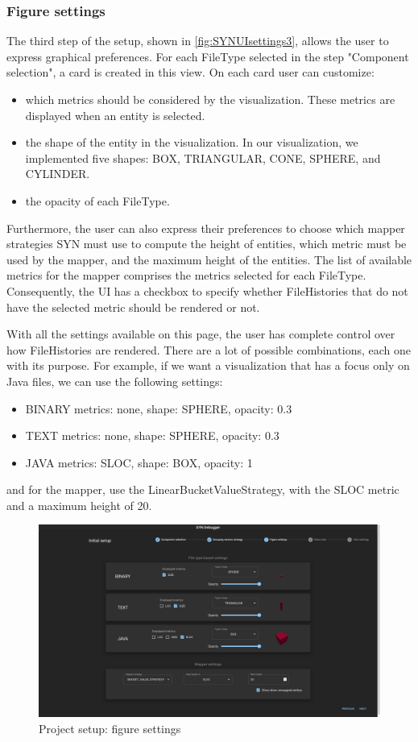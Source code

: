 \subsubsection*{Figure settings}
The third step of the setup, shown in \autoref{fig:SYNUIsettings3}, allows the user to express graphical preferences. 
For each FileType selected in the step "Component selection", a card is created in this view. 
On each card user can customize:
\begin{itemize}
    \item which metrics should be considered by the visualization. These metrics are displayed when an entity is selected.
    \item the shape of the entity in the visualization. In our visualization, we implemented five shapes: BOX, TRIANGULAR, CONE, SPHERE, and CYLINDER. 
    \item the opacity of each FileType. 
\end{itemize}

Furthermore, the user can also express their preferences to choose which mapper strategies SYN must use to compute the height of entities, which metric must be used by the mapper, and the maximum height of the entities. 
The list of available metrics for the mapper comprises the metrics selected for each FileType.
Consequently, the UI has a checkbox to specify whether FileHistories that do not have the selected metric should be rendered or not. 

With all the settings available on this page, the user has complete control over how FileHistories are rendered. 
There are a lot of possible combinations, each one with its purpose. For example, if we want a visualization that has a focus only on Java files, we can use the following settings:
\begin{itemize}
    \item BINARY metrics: none, shape: SPHERE, opacity: 0.3
    \item TEXT metrics: none, shape: SPHERE, opacity: 0.3
    \item JAVA metrics: SLOC, shape: BOX, opacity: 1
\end{itemize}
and for the mapper, use the LinearBucketValueStrategy, with the SLOC metric and a maximum height of 20. 

\begin{figure}
    \center
    \includegraphics[width=\textwidth]{SYNUI-settings3.png}
    \caption{Project setup: figure settings}
    \label{fig:SYNUIsettings3}
\end{figure}

